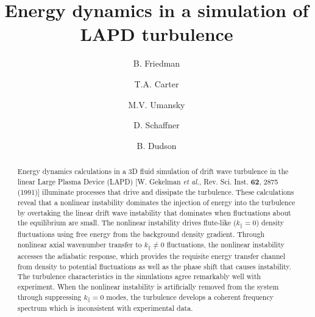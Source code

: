 \documentclass[showpacs,preprintnumbers,amsmath,amssymb,superscriptaddress,aip]{revtex4-1}
\begin{document}
\title{Energy dynamics in a simulation of LAPD turbulence}

\author{B. Friedman}

\author{T.A. Carter}


\author{M.V. Umansky}

\author{D. Schaffner}


\author{B. Dudson}





\begin{abstract}
Energy dynamics calculations in a 3D fluid simulation of drift wave turbulence in the linear Large Plasma Device (LAPD) [W. Gekelman \emph{et al.}, Rev. Sci. Inst. {\bf 62}, 2875 (1991)]
illuminate processes that drive and dissipate the turbulence.
These calculations reveal that a nonlinear instability dominates the injection of energy into the turbulence by overtaking the linear drift
wave instability that dominates when fluctuations about the equilibrium are small.
The nonlinear instability drives flute-like ($k_\parallel = 0$) density fluctuations using free energy from the background density gradient. 
Through nonlinear axial wavenumber transfer to $k_\parallel \ne 0$ fluctuations, the nonlinear instability accesses the adiabatic response, 
which provides the requisite energy transfer channel from density to potential fluctuations as well as the
phase shift that causes instability. The turbulence characteristics in the simulations agree remarkably well with experiment. When the nonlinear instability is artificially 
removed from the system through suppressing $k_\parallel=0$ modes, the turbulence develops a coherent frequency spectrum which is inconsistent
with experimental data. 
\end{abstract}

\maketitle
\end{document}
